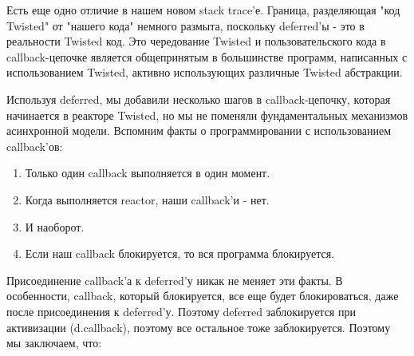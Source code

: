 Есть еще одно отличие в нашем новом stack trace'е. Граница, 
разделяющая "код Twisted" от "нашего кода" немного размыта, 
поскольку deferred'ы - это в реальности Twisted код. Это чередование 
Twisted и пользовательского кода в callback-цепочке является 
общепринятым в большинстве программ, написанных с использованием 
Twisted, активно использующих различные Twisted абстракции.
 

Используя deferred, мы добавили несколько шагов 
в callback-цепочку, которая начинается в реакторе Twisted, 
но мы не поменяли фундаментальных механизмов асинхронной модели. 
Вспомним факты о программировании с использованием callback'ов:

\begin{enumerate}

\item Только один callback выполняется в один момент.

\item Когда выполняется reactor, наши callback'и - нет. 

\item И наоборот.

\item Если наш callback блокируется, то вся программа блокируется.

\end{enumerate}


Присоединение callback'а к deferred'у никак не меняет эти факты. 
В особенности, callback, который блокируется, все еще будет блокироваться, 
даже после присоединения к deferred'у. Поэтому deferred заблокируется при 
активизации (d.callback), поэтому все остальное тоже заблокируется. Поэтому мы заключаем, что:   


